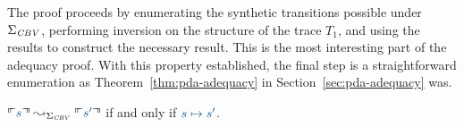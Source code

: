 


\noindent
The proof proceeds by enumerating the synthetic transitions
possible under $\Sigma_{\it CBV}$, performing inversion on the 
structure of the trace $T_1$, and using the results to construct
the necessary result.
This is the most interesting part of the adequacy proof.
With this property established, the
final step is a straightforward enumeration as Theorem~\ref{thm:pda-adequacy}
in Section~\ref{sec:pda-adequacy} was.

\bigskip
\begin{theorem}
$\ctxinterp{s} \leadsto_{\Sigma_{\it CBV}} \ctxinterp{s'}$
if and only if $\obj{s \mapsto s'}$.
\end{theorem}



